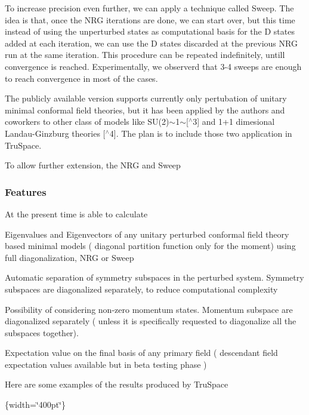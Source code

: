 To increase precision even further, we can apply a technique called {\ttfamily Sweep}. The idea is that, once the {\ttfamily N\+RG} iterations are done, we can start over, but this time instead of using the unperturbed states as computational basis for the D states added at each iteration, we can use the D states discarded at the previous {\ttfamily N\+RG} run at the same iteration. This procedure can be repeated indefinitely, untill convergence is reached. Experimentally, we observerd that 3-\/4 sweeps are enough to reach convergence in most of the cases.

The publicly available version supports currently only pertubation of unitary minimal conformal field theories, but it has been applied by the authors and coworkers to other class of models like S\+U(2)$\sim$1$\sim$\mbox{[}$^\wedge$3\mbox{]} and 1+1 dimesional Landau-\/\+Ginzburg theories \mbox{[}$^\wedge$4\mbox{]}. The plan is to include those two application in Tru\+Space.

To allow further extension, the {\ttfamily N\+RG} and {\ttfamily Sweep}

\subsubsection*{Features}

At the present time is able to calculate


\begin{DoxyItemize}
\item Eigenvalues and Eigenvectors of any unitary perturbed conformal field theory based minimal models ( diagonal partition function only for the moment) using full diagonalization, {\ttfamily N\+RG} or {\ttfamily Sweep}
\item Automatic separation of symmetry subspaces in the perturbed system. Symmetry subspaces are diagonalized separately, to reduce computational complexity
\item Possibility of considering non-\/zero momentum states. Momentum subspace are diagonalized separately ( unless it is specifically requested to diagonalize all the subspaces together).
\item Expectation value on the final basis of any primary field ( descendant field expectation values available but in beta testing phase )
\end{DoxyItemize}

Here are some examples of the results produced by Tru\+Space

\{width=\char`\"{}400pt\char`\"{}\}

